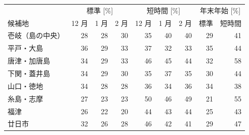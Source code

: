 \begin{tabular}{lrrrrrrrr}
\toprule
& \multicolumn{3}{c}{標準 [\%]} & \multicolumn{3}{c}{短時間 [\%]} & \multicolumn{2}{c}{年末年始 [\%]} \\
候補地 & 12 月 & 1 月 & 2 月 & 12 月 & 1 月 & 2 月 & 標準 & 短時間 \\
\midrule
壱岐（島の中央） & 28 & 28 & 30 & 35 & 40 & 40 & 29 & 41 \\
平戸・大島 & 36 & 29 & 33 & 37 & 32 & 33 & 35 & 44 \\
唐津・加唐島 & 34 & 29 & 33 & 46 & 45 & 44 & 32 & 58 \\
下関・蓋井島 & 34 & 29 & 30 & 35 & 37 & 35 & 30 & 44 \\
山口・徳地 & 34 & 28 & 28 & 36 & 34 & 36 & 34 & 38 \\
糸島・志摩 & 27 & 23 & 23 & 50 & 46 & 49 & 21 & 55 \\
福津 & 26 & 22 & 20 & 44 & 43 & 44 & 25 & 43 \\
廿日市 & 32 & 26 & 28 & 46 & 42 & 41 & 29 & 47 \\
\bottomrule
\end{tabular}
